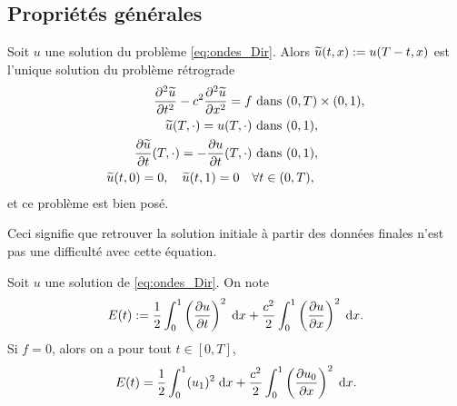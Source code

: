 \documentclass[12pt,a4paper,twoside]{article}
\begin{document}
\subsection{Propri\'et\'es g\'en\'erales}






\begin{proposition}
  Soit $u$ une solution du probl\`eme \eqref{eq:ondes_Dir}.
  Alors $\widetilde{u}(t,x) := u(T-t,x)$ est l'unique solution du probl\`eme
  r\'etrograde
  \begin{align*}
    \dfrac{\partial^2 \widetilde{u}}{\partial t^2} - c^2 \dfrac{\partial^2 \widetilde{u}}{\partial x^2} = f 
    &\text{ dans } (0,T) \times (0,1) ,
    \\
    \widetilde{u}(T,\cdot) = u(T,\cdot) 
    & \text{ dans } (0,1) ,
    \\
    \dfrac{\partial \widetilde{u}}{\partial t}(T,\cdot) = - \dfrac{\partial u}{\partial t}(T,\cdot) 
    & \text{ dans } (0,1) ,
    \\
    \widetilde{u}(t,0) = 0 , \quad \widetilde{u}(t,1) = 0 
    \quad& \forall t \in (0,T) ,
  \end{align*}
  et ce probl\`eme est bien pos\'e.
\end{proposition}
Ceci signifie que retrouver la solution initiale \`a partir des donn\'ees
finales n'est pas une difficult\'e avec cette \'equation.

\begin{proposition}
  \label{prop:ondes_energie}
  Soit $u$ une solution de \eqref{eq:ondes_Dir}.
  On note
  \begin{align*}
    E(t) := \dfrac{1}{2} \int_0^1 \left( \dfrac{\partial u}{\partial t}
    \right)^2 \;\mathrm{d} x + \dfrac{c^2}{2} \int_0^1 \left( \dfrac{\partial u}{\partial x}
    \right)^2 \;\mathrm{d} x .
  \end{align*}
  Si $f = 0$, alors on a pour tout $t \in [0,T]$,
  \begin{align*}
    E(t) = \dfrac{1}{2} \int_0^1 (u_1)^2 \;\mathrm{d} x
    + \dfrac{c^2}{2} \int_0^1 \left(\dfrac{\partial u_0}{\partial x} \right)^2 \;\mathrm{d} x .
  \end{align*}
\end{proposition}
\end{document}

